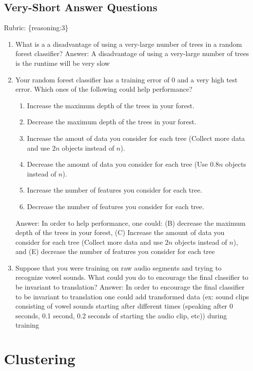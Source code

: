 \documentclass{article}
\def\blu#1{{\color{blu}#1}}
\def\gre#1{{\color{gre}#1}}
\def\enum#1{\begin{enumerate}#1\end{enumerate}}
\def\rubric#1{\gre{Rubric: \{#1\}}}{}
\begin{document}
\subsection{Very-Short Answer Questions}
\rubric{reasoning:3}

\blu{\enum{
\item What is a a disadvantage of using a very-large number of trees in a random forest classifier?
\newline
\gre{Answer: A disadvantage of using a very-large number of trees is the runtime will be very slow}
\item Your random forest classifier has a training error of 0 and a very high test error. Which ones of the following could help performance?
\enum{
\item Increase the maximum depth of the trees in your forest.
\item Decrease the maximum depth of the trees in your forest.
\item Increase the amout of data you consider for each tree (Collect more data and use $2n$ objects instead of $n$).
\item Decrease the amount of data you consider for each tree (Use $0.8n$ objects instead of $n$).
\item Increase the number of features you consider for each tree.
\item Decrease the number of features you consider for each tree.
}
\gre{Answer: In order to help performance, one could: (B) decrease the maximum depth of the trees in your forest, (C) Increase the amount of data you consider for each tree (Collect more data and use $2n$ objects instead of $n$), and (E) decrease the number of features you consider for each tree}
\item Suppose that you were training on raw audio segments and trying to recognize vowel sounds. What could you do to encourage the final classifier to be invariant to translation?
\newline
\gre{Answer: In order to encourage the final classifier to be invariant to translation one could add transformed data (ex: sound clips consisting of vowel sounds starting after different times (speaking after 0 seconds, 0.1 second, 0.2 seconds of starting the audio clip, etc)) during training}
}
}

\section{Clustering}
\end{document}
